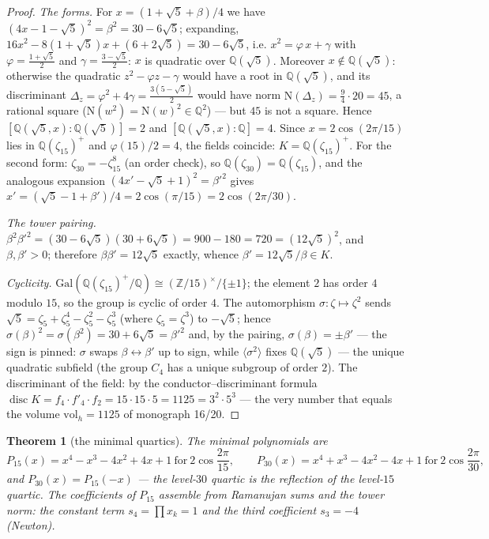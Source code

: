 \documentclass[11pt,a4paper]{article}
\theoremstyle{plain}
\newtheorem{theorem}{Theorem}
\theoremstyle{definition}
\theoremstyle{remark}
\newcommand{\ZZ}{\mathbb{Z}}
\newcommand{\QQ}{\mathbb{Q}}
\newcommand{\disc}{\operatorname{disc}}
\begin{document}
\begin{proof}
\emph{The forms.} For $x=(1+\sqrt5+\beta)/4$ we have
$(4x-1-\sqrt5)^2=\beta^2=30-6\sqrt5$; expanding,
$16x^2-8(1+\sqrt5)x+(6+2\sqrt5)=30-6\sqrt5$, i.e.
$x^2=\varphi\,x+\gamma$ with $\varphi=\frac{1+\sqrt5}{2}$ and
$\gamma=\frac{3-\sqrt5}{2}$: $x$ is quadratic over $\QQ(\sqrt5)$.
Moreover $x\notin\QQ(\sqrt5)$: otherwise the quadratic
$z^2-\varphi z-\gamma$ would have a root in $\QQ(\sqrt5)$, and its
discriminant $\Delta_z=\varphi^2+4\gamma=\frac{3(5-\sqrt5)}{2}$
would have norm $\mathrm{N}(\Delta_z)=\frac94\cdot20=45$, a
rational square ($\mathrm{N}(w^2)=\mathrm{N}(w)^2\in\QQ^2$) ---
but $45$ is not a square. Hence
$[\QQ(\sqrt5,x):\QQ(\sqrt5)]=2$ and $[\QQ(\sqrt5,x):\QQ]=4$.
Since $x=2\cos(2\pi/15)$ lies in $\QQ(\zeta_{15})^+$ and
$\varphi(15)/2=4$, the fields coincide: $K=\QQ(\zeta_{15})^+$.
For the second form: $\zeta_{30}=-\zeta_{15}^8$ (an order check),
so $\QQ(\zeta_{30})=\QQ(\zeta_{15})$, and the analogous expansion
$(4x'-\sqrt5+1)^2=\beta'^2$ gives
$x'=(\sqrt5-1+\beta')/4=2\cos(\pi/15)=2\cos(2\pi/30)$.

\emph{The tower pairing.}
$\beta^2\beta'^2=(30-6\sqrt5)(30+6\sqrt5)=900-180=720=(12\sqrt5)^2$,
and $\beta,\beta'>0$; therefore $\beta\beta'=12\sqrt5$ exactly,
whence $\beta'=12\sqrt5/\beta\in K$.

\emph{Cyclicity.} $\mathrm{Gal}(\QQ(\zeta_{15})^+/\QQ)
\cong(\ZZ/15)^\times/\{\pm1\}$; the element $2$ has order $4$
modulo $15$, so the group is cyclic of order $4$.
The automorphism $\sigma\colon\zeta\mapsto\zeta^2$ sends
$\sqrt5=\zeta_5+\zeta_5^4-\zeta_5^2-\zeta_5^3$ (where
$\zeta_5=\zeta^3$) to $-\sqrt5$; hence
$\sigma(\beta)^2=\sigma(\beta^2)=30+6\sqrt5=\beta'^2$ and, by the
pairing, $\sigma(\beta)=\pm\beta'$ --- the sign is pinned:
$\sigma$ swaps $\beta\leftrightarrow\beta'$ up to sign, while
$\langle\sigma^2\rangle$ fixes $\QQ(\sqrt5)$ --- the unique
quadratic subfield (the group $C_4$ has a unique subgroup of
order $2$). The discriminant of the field: by the
conductor--discriminant formula
$\disc K=f_4\cdot f'_4\cdot f_2=15\cdot15\cdot5=1125=3^2\cdot5^3$
--- the very number that equals the volume
$\mathrm{vol}_h=1125$ of monograph 16/20.
\end{proof}

\begin{theorem}[the minimal quartics]\label{th:quart}
The minimal polynomials are
\[
  P_{15}(x)=x^4-x^3-4x^2+4x+1 \ \text{for}\ 2\cos\frac{2\pi}{15},
  \qquad
  P_{30}(x)=x^4+x^3-4x^2-4x+1 \ \text{for}\ 2\cos\frac{2\pi}{30},
\]
and $P_{30}(x)=P_{15}(-x)$ --- the level-$30$ quartic is the
reflection of the level-$15$ quartic. The coefficients of
$P_{15}$ assemble from Ramanujan sums and the tower norm: the
constant term $s_4=\prod x_k=1$ and the third coefficient
$s_3=-4$ (Newton).
\end{theorem}
\end{document}
